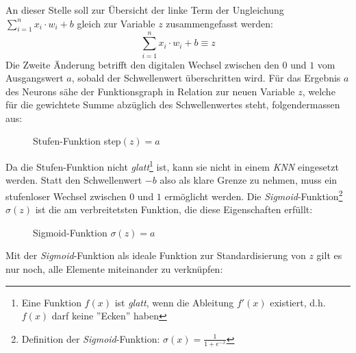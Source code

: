 An dieser Stelle soll zur Übersicht der linke Term der Ungleichung $\sum_{i=1}^{n} x_i\cdot w_i+b$ gleich zur Variable $z$ zusammengefasst werden:
\begin{equation}\label{eq:def_z}
\sum_{i=1}^{n} x_i\cdot w_i+b\equiv z
\end{equation}
Die Zweite Änderung betrifft den digitalen Wechsel zwischen den $0$ und $1$ vom Ausgangswert $a$, sobald der Schwellenwert überschritten wird. Für das Ergebnis $a$ des Neurons sähe der Funktionsgraph in Relation zur neuen Variable $z$, welche für die gewichtete Summe abzüglich des Schwellenwertes steht, folgendermassen aus:

\begin{figure}[h]
	\centering
	\caption[Stufen-Funktion]{Stufen-Funktion step$(z) = a$}
	\label{plt:step}
\end{figure}
Da die Stufen-Funktion nicht \textit{glatt}\footnote{Eine Funktion $f(x)$ ist \textit{glatt}, wenn die Ableitung $f'(x)$ existiert, d.h. $f(x)$ darf keine ''Ecken'' haben} ist, kann sie nicht in einem \textit{KNN} eingesetzt werden. Statt den Schwellenwert $-b$ also als klare Grenze zu nehmen, muss ein stufenloser Wechsel zwischen $0$ und $1$ ermöglicht werden. Die \textit{Sigmoid}-Funktion\footnote{Definition der \textit{Sigmoid}-Funktion: $\sigma(x) = \frac{1}{1+e^{-x}}$} $\sigma(z)$ ist die am verbreitetsten Funktion, die diese Eigenschaften erfüllt: 


\begin{figure}[h]
	\centering
	\caption[Sigmoid-Funktion]{Sigmoid-Funktion $\sigma(z) = a$}
	\label{plt:sigmoid}
\end{figure}
Mit der \textit{Sigmoid}-Funktion als ideale Funktion zur Standardisierung von $z$ gilt es nur noch, alle Elemente miteinander zu verknüpfen:



